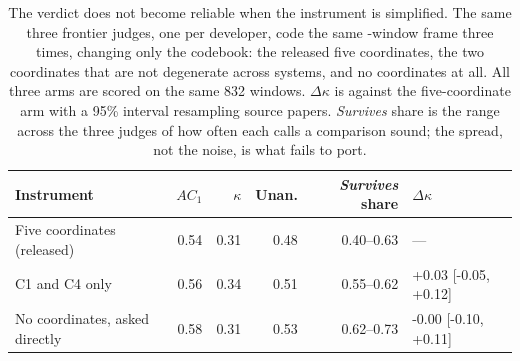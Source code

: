\begin{table}[t]
\centering\scriptsize
\setlength{\tabcolsep}{3pt}
\begin{tabular}{@{}lrrrrl@{}}
\toprule
Instrument & $AC_1$ & $\kappa$ & Unan. & \emph{Survives} share & $\Delta\kappa$ \\
\midrule
Five coordinates (released) & 0.54 & 0.31 & 0.48 & 0.40--0.63 & --- \\
C1 and C4 only & 0.56 & 0.34 & 0.51 & 0.55--0.62 & +0.03 [-0.05, +0.12] \\
No coordinates, asked directly & 0.58 & 0.31 & 0.53 & 0.62--0.73 & -0.00 [-0.10, +0.11] \\
\bottomrule
\end{tabular}
\caption{The verdict does not become reliable when the instrument is simplified. The same three frontier judges, one per developer, code the same \FrameCandidates{}-window frame three times, changing only the codebook: the released five coordinates, the two coordinates that are not degenerate across systems, and no coordinates at all. All three arms are scored on the same 832 windows. $\Delta\kappa$ is against the five-coordinate arm with a 95\% interval resampling source papers. \emph{Survives} share is the range across the three judges of how often each calls a comparison sound; the spread, not the noise, is what fails to port.}
\label{tab:codebook-ablation}
\end{table}
